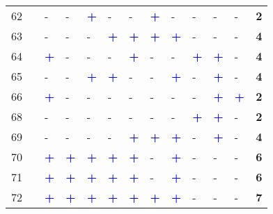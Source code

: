 \begin{longtable}{p{0.5cm}p{4.6cm}p{0.3cm}p{0.3cm}p{0.3cm}p{0.3cm}p{0.3cm}p{0.3cm}p{0.3cm}p{0.3cm}p{0.3cm}p{0.3cm}p{1cm}}
    \small{62} & \small{\textcite{giansoldati_train-feeder_2021}}\index{Giansoldati, Marco|pagebf} & - & - & \textcolor{blue}{\textbf{+}} & - & - & \textcolor{blue}{\textbf{+}} & - & - & - & - & \textbf{2}\\
    \small{63} & \small{\textcite{givoni_access_2007}}\index{Givoni, Moshe|pagebf} & - & - & - & \textcolor{blue}{\textbf{+}} & \textcolor{blue}{\textbf{+}} & \textcolor{blue}{\textbf{+}} & \textcolor{blue}{\textbf{+}} & - & - & - & \textbf{4}\\
    \small{64} & \small{\textcite{glass_role_2020}}\index{Glass, Caroline|pagebf} & \textcolor{blue}{\textbf{+}} & - & - & - & \textcolor{blue}{\textbf{+}} & - & - & \textcolor{blue}{\textbf{+}} & \textcolor{blue}{\textbf{+}} & - & \textbf{4}\\
    \small{65} & \small{\textcite{van_goeverden_potential_2018}}\index{van Goeverden, Kees|pagebf} & - & - & \textcolor{blue}{\textbf{+}} & \textcolor{blue}{\textbf{+}} & - & - & \textcolor{blue}{\textbf{+}} & - & \textcolor{blue}{\textbf{+}} & - & \textbf{4}\\
    \small{66} & \small{\textcite{griffin_planning_2016}}\index{Griffin, Greg|pagebf} & \textcolor{blue}{\textbf{+}} & - & - & - & - & - & - & - & \textcolor{blue}{\textbf{+}} & \textcolor{blue}{\textbf{+}} & \textbf{2}\\
    \small{68} & \small{\textcite{gu_measuring_2019}}\index{Gu, Tianqi|pagebf} & - & - & - & - & - & - & - & \textcolor{blue}{\textbf{+}} & \textcolor{blue}{\textbf{+}} & - & \textbf{2}\\
    \small{69} & \small{\textcite{guo_exploring_2023}}\index{Guo, Dongbo|pagebf} & - & - & - & - & \textcolor{blue}{\textbf{+}} & \textcolor{blue}{\textbf{+}} & \textcolor{blue}{\textbf{+}} & - & \textcolor{blue}{\textbf{+}} & - & \textbf{4}\\
    \small{70} & \small{\textcite{guo_built_2020}}\index{Guo, Yuanyuan|pagebf} & \textcolor{blue}{\textbf{+}} & \textcolor{blue}{\textbf{+}} & \textcolor{blue}{\textbf{+}} & \textcolor{blue}{\textbf{+}} & \textcolor{blue}{\textbf{+}} & - & \textcolor{blue}{\textbf{+}} & - & - & - & \textbf{6}\\
    \small{71} & \small{\textcite{guo_role_2021}}\index{Guo, Yuanyuan|pagebf} & \textcolor{blue}{\textbf{+}} & \textcolor{blue}{\textbf{+}} & \textcolor{blue}{\textbf{+}} & \textcolor{blue}{\textbf{+}} & \textcolor{blue}{\textbf{+}} & - & \textcolor{blue}{\textbf{+}} & - & - & - & \textbf{6}\\
    \small{72} & \small{\textcite{guo_dockless_2021}}\index{Guo, Yuanyuan|pagebf} & \textcolor{blue}{\textbf{+}} & \textcolor{blue}{\textbf{+}} & \textcolor{blue}{\textbf{+}} & \textcolor{blue}{\textbf{+}} & \textcolor{blue}{\textbf{+}} & \textcolor{blue}{\textbf{+}} & \textcolor{blue}{\textbf{+}} & - & - & - & \textbf{7}\\

\end{longtable}
